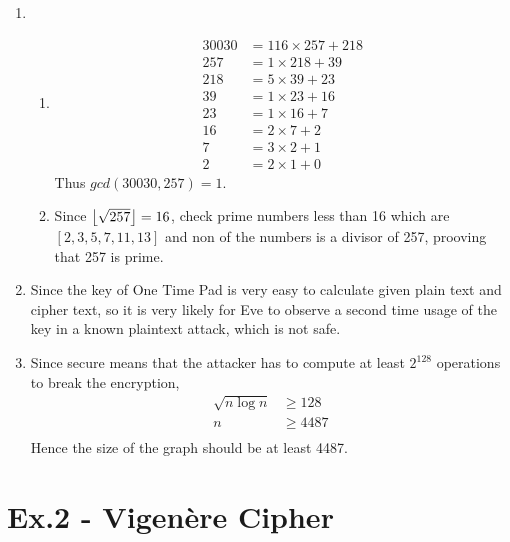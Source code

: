 \documentclass[12pt]{article}
\DeclarePairedDelimiter\floor{\lfloor}{\rfloor}
\begin{document}
\begin{enumerate}
	\item 
	\begin{enumerate}
		\item 
		\begin{align*}
			30030 &= 116 \times 257 + 218\\
			257 &= 1 \times 218 + 39\\
			218 &= 5 \times 39 + 23\\
			39 &= 1 \times 23 + 16\\
			23 &= 1 \times 16 + 7\\
			16 &= 2 \times 7 + 2\\
			7 &= 3 \times 2 + 1\\
			2 &= 2 \times 1 + 0
		\end{align*}
		Thus $gcd(30030, 257)=1$.
		\item Since $\floor*{\sqrt{257}}=16$, check prime numbers less than 16 which are $[2,3,5,7,11,13]$ and non of the numbers is a divisor of 257, prooving that 257 is prime.
	\end{enumerate}

	\item Since the key of One Time Pad is very easy to calculate given plain text and cipher text, so it is very likely for Eve to observe a second time usage of the key in a known plaintext attack, which is not safe.
	\item Since secure means that the attacker has to compute at least $2^{128}$ operations to break the encryption, 
	\begin{align*}
		\sqrt{n \log{n}} &\ge 128 \\
		n &\ge 4487 \\
	\end{align*}
	Hence the size of the graph should be at least 4487.
\end{enumerate}

\section*{Ex.2 - Vigenère Cipher}
\end{document}

